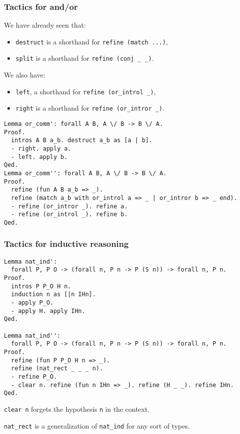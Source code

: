 \documentclass{beamer}
\begin{document}
\begin{frame}[fragile]
\frametitle{Tactics for and/or}

We have already seen that:
\begin{itemize}
\item \texttt{destruct} is a shorthand for \texttt{refine (match ...)},
\item \texttt{split} is a shorthand for \texttt{refine (conj _ _)}.
\end{itemize}

\vfill

We also have:
\begin{itemize}
\item \texttt{left}, a shorthand for \texttt{refine (or_introl _)},
\item \texttt{right} is a shorthand for \texttt{refine (or_intror _)}.
\end{itemize}

\vfill

{
\footnotesize
\begin{verbatim}
Lemma or_comm': forall A B, A \/ B -> B \/ A.
Proof.
  intros A B a_b. destruct a_b as [a | b].
  - right. apply a.
  - left. apply b.
Qed.
Lemma or_comm'': forall A B, A \/ B -> B \/ A.
Proof.
  refine (fun A B a_b => _).
  refine (match a_b with or_introl a => _ | or_intror b => _ end).
  - refine (or_intror _). refine a.
  - refine (or_introl _). refine b.
Qed.
\end{verbatim}
}
\end{frame}
\begin{frame}[fragile]
\frametitle{Tactics for inductive reasoning}

{
\footnotesize
\begin{verbatim}
Lemma nat_ind':
  forall P, P O -> (forall n, P n -> P (S n)) -> forall n, P n.
Proof.
  intros P P_O H n.
  induction n as [|n IHn].
  - apply P_O.
  - apply H. apply IHn.
Qed.

Lemma nat_ind'':
  forall P, P O -> (forall n, P n -> P (S n)) -> forall n, P n.
Proof.
  refine (fun P P_O H n => _).
  refine (nat_rect _ _ _ n).
  - refine P_O.
  - clear n. refine (fun n IHn => _). refine (H _ _). refine IHn.
Qed.
\end{verbatim}

\vfill

\texttt{clear n} forgets the hypothesis \texttt{n} in the context.

\texttt{nat_rect} is a generalization of \texttt{nat_ind}
for any sort of types.
}
\end{frame}
\end{document}

